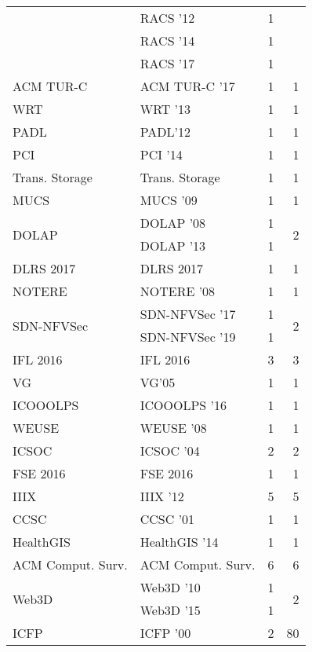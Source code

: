 \begin{table*}[t]
\begin{tabular}{llrr}
& RACS '12 & 1 &\\
& RACS '14 & 1 &\\
& RACS '17 & 1 &\\
\multirow{1}{*}{ACM TUR-C } & ACM TUR-C '17 & 1 & \multirow{1}{*}{1}\\
\multirow{1}{*}{WRT } & WRT '13 & 1 & \multirow{1}{*}{1}\\
\multirow{1}{*}{PADL} & PADL'12 & 1 & \multirow{1}{*}{1}\\
\multirow{1}{*}{PCI } & PCI '14 & 1 & \multirow{1}{*}{1}\\
\multirow{1}{*}{Trans. Storage} & Trans. Storage & 1 & \multirow{1}{*}{1}\\
\multirow{1}{*}{MUCS } & MUCS '09 & 1 & \multirow{1}{*}{1}\\
\multirow{2}{*}{DOLAP } & DOLAP '08 & 1 & \multirow{2}{*}{2}\\
& DOLAP '13 & 1 &\\
\multirow{1}{*}{DLRS 2017} & DLRS 2017 & 1 & \multirow{1}{*}{1}\\
\multirow{1}{*}{NOTERE } & NOTERE '08 & 1 & \multirow{1}{*}{1}\\
\multirow{2}{*}{SDN-NFVSec } & SDN-NFVSec '17 & 1 & \multirow{2}{*}{2}\\
& SDN-NFVSec '19 & 1 &\\
\multirow{1}{*}{IFL 2016} & IFL 2016 & 3 & \multirow{1}{*}{3}\\
\multirow{1}{*}{VG} & VG'05 & 1 & \multirow{1}{*}{1}\\
\multirow{1}{*}{ICOOOLPS } & ICOOOLPS '16 & 1 & \multirow{1}{*}{1}\\
\multirow{1}{*}{WEUSE } & WEUSE '08 & 1 & \multirow{1}{*}{1}\\
\multirow{1}{*}{ICSOC } & ICSOC '04 & 2 & \multirow{1}{*}{2}\\
\multirow{1}{*}{FSE 2016} & FSE 2016 & 1 & \multirow{1}{*}{1}\\
\multirow{1}{*}{IIIX } & IIIX '12 & 5 & \multirow{1}{*}{5}\\
\multirow{1}{*}{CCSC } & CCSC '01 & 1 & \multirow{1}{*}{1}\\
\multirow{1}{*}{HealthGIS } & HealthGIS '14 & 1 & \multirow{1}{*}{1}\\
\multirow{1}{*}{ACM Comput. Surv.} & ACM Comput. Surv. & 6 & \multirow{1}{*}{6}\\
\multirow{2}{*}{Web3D } & Web3D '10 & 1 & \multirow{2}{*}{2}\\
& Web3D '15 & 1 &\\
\multirow{18}{*}{ICFP } & ICFP '00 & 2 & \multirow{18}{*}{80}\\

\end{tabular}
\end{table*}
